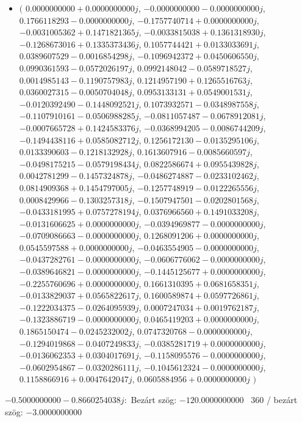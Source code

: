 \documentclass[14pt,a4paper]{article}
\begin{document}
\begin{itemize}
\item
$\big($
$0.0000000000+0.0000000000j$, $-0.0000000000-0.0000000000j$, $0.1766118293-0.0000000000j$, $-0.1757740714+0.0000000000j$, $-0.0031005362+0.1471821365j$, $-0.0033815038+0.1361318930j$, $-0.1268673016+0.1335373436j$, $0.1057744421+0.0133033691j$, $0.0389607529-0.0016854298j$, $-0.1096942372+0.0450606550j$, $0.0990361593-0.0572026197j$, $0.0992148042-0.0589718527j$, $0.0014985143-0.1190757983j$, $0.1214957190+0.1265516763j$, $0.0360027315-0.0050704048j$, $0.0953133131+0.0549001531j$, $-0.0120392490-0.1448092521j$, $0.1073932571-0.0348987558j$, $-0.1107910161-0.0506988285j$, $-0.0811057487-0.0678912081j$, $-0.0007665728+0.1424583376j$, $-0.0368994205-0.0086744209j$, $-0.1494438116+0.0585082712j$, $0.1256172130-0.0135295106j$, $0.0133390603-0.1218132928j$, $0.1613607916-0.0085660597j$, $-0.0498175215-0.0579198434j$, $0.0822586674+0.0955439828j$, $0.0042781299-0.1457324878j$, $-0.0486274887-0.0233102462j$, $0.0814909368+0.1454797005j$, $-0.1257748919-0.0122265556j$, $0.0008429966-0.1303257318j$, $-0.1507947501-0.0202801568j$, $-0.0433181995+0.0757278194j$, $0.0376966560+0.1491033208j$, $-0.0131606625+0.0000000000j$, $-0.0394969877-0.0000000000j$, $-0.0709086663-0.0000000000j$, $0.1268091206+0.0000000000j$, $0.0545597588+0.0000000000j$, $-0.0463554905-0.0000000000j$, $-0.0437282761-0.0000000000j$, $-0.0606776062-0.0000000000j$, $-0.0389646821-0.0000000000j$, $-0.1445125677+0.0000000000j$, $-0.2255760696+0.0000000000j$, $0.1661310395+0.0681658351j$, $-0.0133829037+0.0565822617j$, $0.1600589874+0.0597726861j$, $-0.1222034375-0.0264095939j$, $0.0007247034+0.0019762187j$, $-0.1323886719-0.0000000000j$, $0.0465419203+0.0000000000j$, $0.1865150474-0.0245232002j$, $0.0747320768-0.0000000000j$, $-0.1294019868-0.0407249833j$, $-0.0385281719+0.0000000000j$, $-0.0136062353+0.0304017691j$, $-0.1158095576-0.0000000000j$, $-0.0602954867-0.0320286111j$, $-0.1045612324-0.0000000000j$, $0.1158866916+0.0047642047j$, $0.0605884956+0.0000000000j$
$\big)$
\end{itemize}
$-0.5000000000-0.8660254038j$:\
Bezárt szög: $-120.0000000000$ \
360 / bezárt szög: $-3.0000000000$\
\end{document}
